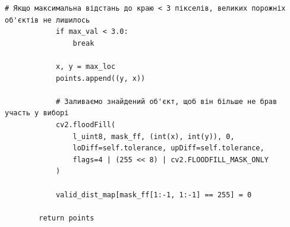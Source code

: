 \begin{lstlisting}[caption={Класи просторового семплювання координат (PyTorch, OpenCV)}]
            # Якщо максимальна відстань до краю < 3 пікселів, великих порожніх об'єктів не лишилось
            if max_val < 3.0:
                break
                
            x, y = max_loc
            points.append((y, x))
            
            # Заливаємо знайдений об'єкт, щоб він більше не брав участь у виборі
            cv2.floodFill(
                l_uint8, mask_ff, (int(x), int(y)), 0, 
                loDiff=self.tolerance, upDiff=self.tolerance, 
                flags=4 | (255 << 8) | cv2.FLOODFILL_MASK_ONLY
            )

            valid_dist_map[mask_ff[1:-1, 1:-1] == 255] = 0
            
        return points
\end{lstlisting}

